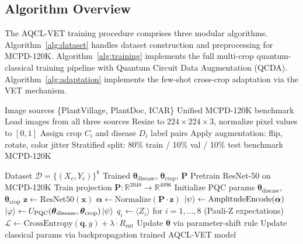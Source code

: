 \documentclass[conference]{IEEEtran}
\begin{document}
\subsection{Algorithm Overview}

The AQCL-VET training procedure comprises three modular algorithms. Algorithm~\ref{alg:dataset} handles dataset construction and preprocessing for MCPD-120K. Algorithm~\ref{alg:training} implements the full multi-crop quantum-classical training pipeline with Quantum Circuit Data Augmentation (QCDA). Algorithm~\ref{alg:adaptation} implements the few-shot cross-crop adaptation via the VET mechanism.

\begin{algorithm}
\caption{MCPD-120K Dataset Construction}
\label{alg:dataset}
\begin{algorithmic}[1]
\REQUIRE Image sources \{PlantVillage, PlantDoc, ICAR\}
\ENSURE Unified MCPD-120K benchmark
\STATE Load images from all three sources
\STATE Resize to $224\times224\times3$, normalize pixel values to $[0,1]$
\STATE Assign crop $C_i$ and disease $D_i$ label pairs
\STATE Apply augmentation: flip, rotate, color jitter
\STATE Stratified split: 80\% train / 10\% val / 10\% test
\RETURN benchmark MCPD-120K
\end{algorithmic}
\end{algorithm}

\begin{algorithm}
\caption{AQCL-VET Full Training Pipeline}
\label{alg:training}
\begin{algorithmic}[1]
\REQUIRE Dataset $\mathcal{D} = \{(X_c, Y_c)\}^k$
\ENSURE Trained $\boldsymbol{\theta}_\text{disease}$, $\boldsymbol{\theta}_\text{crop}$, $\mathbf{P}$
\STATE Pretrain ResNet-50 on MCPD-120K
\STATE Train projection $\mathbf{P}: \mathbb{R}^{2048} \to \mathbb{R}^{4096}$
\STATE Initialize PQC params $\boldsymbol{\theta}_\text{disease}$, $\boldsymbol{\theta}_\text{crop}$
  \STATE $\mathbf{z} \leftarrow \text{ResNet50}(\mathbf{x})$
  \STATE $\boldsymbol{\alpha} \leftarrow \text{Normalize}(\mathbf{P} \cdot \mathbf{z})$
  \STATE $\ket{\psi} \leftarrow \text{AmplitudeEncode}(\boldsymbol{\alpha})$
  \STATE $\ket{\varphi} \leftarrow U_\text{PQC}(\boldsymbol{\theta}_\text{disease}, \boldsymbol{\theta}_\text{crop})\ket{\psi}$
  \STATE $q_i \leftarrow \langle Z_i \rangle$ for $i = 1, \ldots, 8$ (Pauli-Z expectations)
  \STATE $\mathcal{L} \leftarrow \text{CrossEntropy}(\mathbf{q}, y) + \lambda \cdot R_\text{ent}$
  \STATE Update $\boldsymbol{\theta}$ via parameter-shift rule
  \STATE Update classical params via backpropagation
\ENDFOR
\RETURN trained AQCL-VET model
\end{algorithmic}
\end{algorithm}
\end{document}
